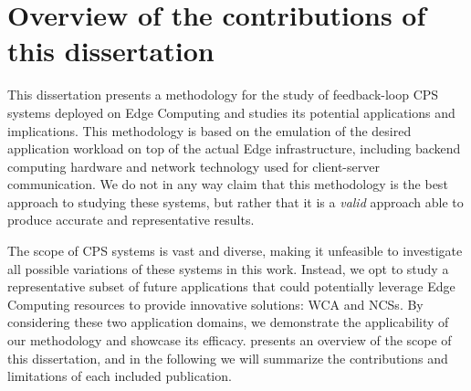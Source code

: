 \section{Overview of the contributions of this dissertation}



This dissertation presents a methodology for the study of feedback-loop \gls{CPS} systems deployed on Edge Computing and studies its potential applications and implications.
This methodology is based on the emulation of the desired application workload on top of the actual Edge infrastructure, including backend computing hardware and network technology used for client-server communication.
We do not in any way claim that this methodology is the best approach to studying these systems, but rather that it is a \emph{valid} approach able to produce accurate and representative results.



The scope of \gls{CPS} systems is vast and diverse, making it unfeasible to investigate all possible variations of these systems in this work. 
Instead, we opt to study a representative subset of future applications that could potentially leverage Edge Computing resources to provide innovative solutions: \gls{WCA} and \glspl{NCS}.
By considering these two application domains, we demonstrate the applicability of our methodology and showcase its efficacy.
 presents an overview of the scope of this dissertation, and in the following we will summarize the contributions and limitations of each included publication. 

